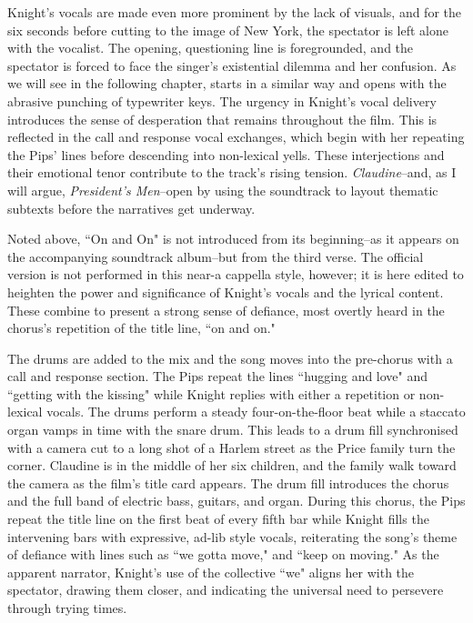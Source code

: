Knight's vocals are made even more prominent by the lack of visuals, and for the six seconds before cutting to the image of New York, the spectator is left alone with the vocalist.
The opening, questioning line is foregrounded, and the spectator is forced to face the singer's existential dilemma and her confusion.
As we will see in the following chapter, \textcite{pakula_all_1976} starts in a similar way and opens with the abrasive punching of typewriter keys.
The urgency in Knight's vocal delivery introduces the sense of desperation that remains throughout the film.
This is reflected in the call and response vocal exchanges, which begin with her repeating the Pips' lines before descending into non-lexical yells.
These interjections and their emotional tenor contribute to the track's rising tension.
\textit{Claudine}–and, as I will argue, \textit{President's Men}–open by using the soundtrack to layout thematic subtexts before the narratives get underway.

Noted above, ``On and On" is not introduced from its beginning–as it appears on the accompanying soundtrack album–but from the third verse.
The official version is not performed in this near-a cappella style, however; it is here edited to heighten the power and significance of Knight's vocals and the lyrical content.
These combine to present a strong sense of defiance, most overtly heard in the chorus's repetition of the title line, ``on and on."

The drums are added to the mix and the song moves into the pre-chorus with a call and response section.
The Pips repeat the lines ``hugging and love" and ``getting with the kissing" while Knight replies with either a repetition or non-lexical vocals.
The drums perform a steady four-on-the-floor beat while a staccato organ vamps in time with the snare drum.
This leads to a drum fill synchronised with a camera cut to a long shot of a Harlem street as the Price family turn the corner.
Claudine is in the middle of her six children, and the family walk toward the camera as the film's title card appears.
The drum fill introduces the chorus and the full band of electric bass, guitars, and organ.
During this chorus, the Pips repeat the title line on the first beat of every fifth bar while Knight fills the intervening bars with expressive, ad-lib style vocals, reiterating the song's theme of defiance with lines such as ``we gotta move," and ``keep on moving."
As the apparent narrator, Knight's use of the collective ``we" aligns her with the spectator, drawing them closer, and indicating the universal need to persevere through trying times.

